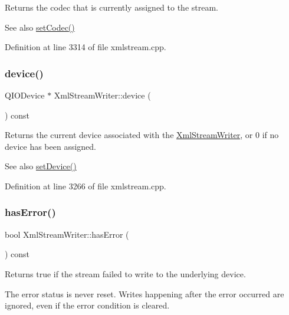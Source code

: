 Returns the codec that is currently assigned to the stream.

\begin{DoxySeeAlso}{See also}
\hyperlink{class_xml_stream_writer_ab73a5ee5db6824afd4a2bc66e8f12e78}{set\+Codec()} 
\end{DoxySeeAlso}


Definition at line 3314 of file xmlstream.\+cpp.

\mbox{\label{class_xml_stream_writer_a306a738e0aad39898ee318c7b7c8bc3c}} 
\subsubsection{\texorpdfstring{device()}{device()}}
{\footnotesize\ttfamily Q\+I\+O\+Device $\ast$ Xml\+Stream\+Writer\+::device (\begin{DoxyParamCaption}{ }\end{DoxyParamCaption}) const}

Returns the current device associated with the \hyperlink{class_xml_stream_writer}{Xml\+Stream\+Writer}, or 0 if no device has been assigned.

\begin{DoxySeeAlso}{See also}
\hyperlink{class_xml_stream_writer_ac03d4a48cc662d5c43a136560f514fd3}{set\+Device()} 
\end{DoxySeeAlso}


Definition at line 3266 of file xmlstream.\+cpp.

\mbox{\label{class_xml_stream_writer_a8a336415622c257d2df545b088e38eef}} 
\subsubsection{\texorpdfstring{has\+Error()}{hasError()}}
{\footnotesize\ttfamily bool Xml\+Stream\+Writer\+::has\+Error (\begin{DoxyParamCaption}{ }\end{DoxyParamCaption}) const}

Returns {\ttfamily true} if the stream failed to write to the underlying device.

The error status is never reset. Writes happening after the error occurred are ignored, even if the error condition is cleared. 

